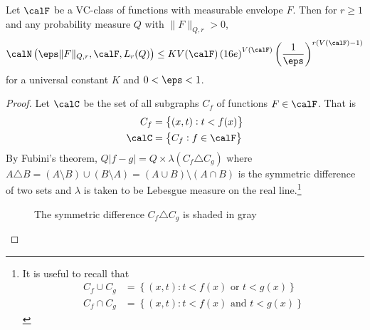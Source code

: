\begin{theorem}
	\label{thm:vdv2.6.7}
	Let \(\calF\) be a VC-class of functions with measurable envelope \(F\). Then for \(r\geq 1\) and any probability measure \(Q\) with \(\|F\|_{Q,r} > 0\),
	\begin{equation}
		\label{eq:vc-function-covering}
		\calN\left(\eps\|F\|_{Q,r},\calF,L_r(Q)\right) \leq KV(\calF)\left(16e\right)^{V(\calF)}\left(\frac{1}{\eps}\right)^{r(V(\calF)-1)}
	\end{equation}
	for a universal constant \(K\) and \(0 < \eps < 1\).
\end{theorem}
\begin{proof}
	Let \(\calC\) be the set of all subgraphs \(C_f\) of functions \(F\in\calF\). That is
	\begin{align*}
		C_f &= \left\{(x,t): t < f(x)\right\} \\
		\calC &= \left\{C_f: f\in\calF\right\}
	\end{align*}
	By Fubini's theorem, \(Q|f-g| = Q\times\lambda\left(C_f\triangle C_g\right)\) where \(A\triangle B = (A\setminus B)\cup(B\setminus A) = (A\cup B) \setminus (A\cap B)\) is the symmetric difference of two sets and \(\lambda\) is taken to be Lebesgue measure on the real line.\footnote{It is useful to recall that 
	\begin{align*}
		C_f \cup C_g &= \left\{(x,t): t < f(x)\text{ or }t < g(x)\right\} \\
		C_f \cap C_g &= \left\{(x,t): t < f(x)\text{ and }t< g(x)\right\}
	\end{align*}}
	\begin{figure}[htpb]
		\centering
		\caption{The symmetric difference \(C_f\triangle C_g\) is shaded in gray}%
		\label{fig:symmetric-diff}
	\end{figure}
\end{proof}

